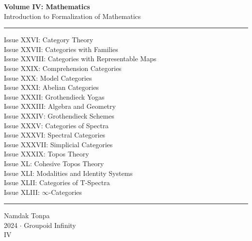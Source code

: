 \documentclass{article}
\begin{document}
\begin{titlepage}
    \centering
    \vspace*{0.5in}
    \Huge
    \textbf{Volume IV: Mathematics} \\
    \LARGE
    Introduction to Formalization of Mathematics \\
    \vspace{1.5in}
    \rule{\textwidth}{0.4pt}
    \small
    \flushleft
    Issue XXVI: Category Theory \\
    Issue XXVII: Categories with Families \\
    Issue XXVIII: Categories with Representable Maps \\
    Issue XXIX: Comprehension Categories \\
    Issue XXX: Model Categories \\
    Issue XXXI: Abelian Categories \\
    Issue XXXII: Grothendieck Yogas \\
    Issue XXXIII: Algebra and Geometry \\
    Issue XXXIV: Grothendieck Schemes \\
    Issue XXXV: Categories of Spectra \\
    Issue XXXVI: Spectral Categories \\
    Issue XXXVII: Simplicial Categories \\
    Issue XXXIX: Topos Theory \\
    Issue XL: Cohesive Topos Theory \\
    Issue XLI: Modalities and Identity Systems \\
    Issue XLII: Categories of T-Spectra \\
    Issue XLIII: $\infty$-Categories \\
    \rule{\textwidth}{0.4pt}
    \centering
    \vfill
    \large
    Namdak Tonpa \\
    \Large
    2024 $\cdot$ Groupoid Infinity \\
    IV
\end{titlepage}
\end{document}

